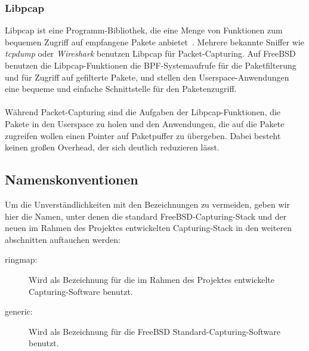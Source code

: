 \subsubsection{Libpcap}\label{sec:libpcap}
Libpcap ist eine Programm-Bibliothek, die eine Menge von Funktionen zum
bequemen Zugriff auf empfangene Pakete anbietet~\cite{man_pcap}. Mehrere
bekannte Sniffer wie \emph{tcpdump} oder \emph{Wireshark} benutzen Libpcap für
Packet-Capturing.  Auf FreeBSD benutzen die Libpcap-Funktionen  die
BPF-Systemaufrufe für die Paketfilterung und für Zugriff auf gefilterte Pakete,
und stellen den Userspace-Anwendungen eine bequeme und einfache Schnittstelle für
den Paketenzugriff.\\\\
%
Während Packet-Capturing sind die Aufgaben der Libpcap-Funktionen, die Pakete
in den Userspace zu holen und den Anwendungen, die auf die Pakete zugreifen
wollen einen Pointer auf Paketpuffer zu übergeben. Dabei besteht keinen großen
Overhead, der sich deutlich reduzieren lässt.


\subsection{Namenskonventionen}
Um die Unverständlichkeiten mit den Bezeichnungen zu vermeiden, geben wir 
hier die Namen, unter denen die standard FreeBSD-Capturing-Stack und 
der neuen im Rahmen des Projektes entwickelten Capturing-Stack in den 
weiteren abschnitten auftauchen werden: 
\begin{description}
	\item[ringmap:] Wird als Bezeichnung für die im Rahmen des Projektes 
		entwickelte Capturing-Software benutzt. 
	\item [generic:] Wird als Bezeichnung für die FreeBSD Standard-Capturing-Software benutzt.
\end{description}

